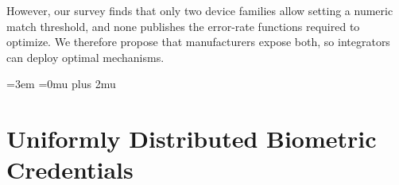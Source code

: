 \documentclass[conference,compsoc]{IEEEtran}
\begin{document}
However, our survey finds that only two device families allow setting a numeric match threshold, and none publishes the error-rate functions required to optimize. We therefore propose that manufacturers expose both, so integrators can deploy optimal mechanisms.
{
\raggedright
\emergencystretch=3em
\Urlmuskip=0mu plus 2mu\relax
\def\UrlBreaks{%
  \do\a\do\b\do\c\do\d\do\e\do\f\do\g\do\h\do\i\do\j\do\k\do\l\do\m
  \do\n\do\o\do\p\do\q\do\r\do\s\do\t\do\u\do\v\do\w\do\x\do\y\do\z
  \do\A\do\B\do\C\do\D\do\E\do\F\do\G\do\H\do\I\do\J\do\K\do\L\do\M
  \do\N\do\O\do\P\do\Q\do\R\do\S\do\T\do\U\do\V\do\W\do\X\do\Y\do\Z
  \do\0\do\1\do\2\do\3\do\4\do\5\do\6\do\7\do\8\do\9
  \do\/\do\-\do\.\do\_\do\?\do\&\do\=\do\#}


}

\appendices

\section{Uniformly Distributed Biometric Credentials}\label{app:uniform_biocred}
\noindent
\end{document}

